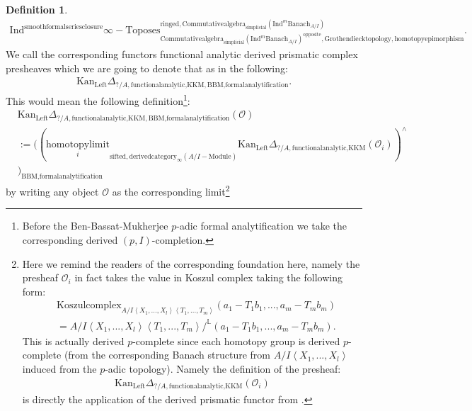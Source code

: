 \documentclass[11pt]{book}
\theoremstyle{definition}
\newtheorem{definition}[theorem]{Definition}
\numberwithin{equation}{section}
\begin{document}
\begin{definition}
\begin{align}
\mathrm{Ind}^\text{smoothformalseriesclosure}\infty-\mathrm{Toposes}^{\mathrm{ringed},\mathrm{Commutativealgebra}_{\mathrm{simplicial}}(\mathrm{Ind}^m\mathrm{Banach}_{A/I})}_{\mathrm{Commutativealgebra}_{\mathrm{simplicial}}(\mathrm{Ind}^m\mathrm{Banach}_{A/I})^\mathrm{opposite},\mathrm{Grothendiecktopology,homotopyepimorphism}}. 
\end{align}
We call the corresponding functors functional analytic derived prismatic complex presheaves which we are going to denote that as in the following:
\begin{align}
\mathrm{Kan}_{\mathrm{Left}}\Delta_{?/A,\text{functionalanalytic,KKM},\text{BBM,formalanalytification}}.	
\end{align}
This would mean the following definition{\footnote{Before the Ben-Bassat-Mukherjee $p$-adic formal analytification we take the corresponding derived $(p,I)$-completion.}}:
\begin{align}
&\mathrm{Kan}_{\mathrm{Left}}\Delta_{?/A,\text{functionalanalytic,KKM},\text{BBM,formalanalytification}}(\mathcal{O})\\
&:=	((\underset{i}{\text{homotopylimit}}_{\text{sifted},\text{derivedcategory}_{\infty}(A/I-\text{Module})}\mathrm{Kan}_{\mathrm{Left}}\Delta_{?/A,\text{functionalanalytic,KKM}}(\mathcal{O}_i))^\wedge\\
&)_\text{BBM,formalanalytification}
\end{align}
by writing any object $\mathcal{O}$ as the corresponding limit\footnote{Here we remind the readers of the corresponding foundation here, namely the presheaf $\mathcal{O}_i$ in fact takes the value in Koszul complex taking the following form:
\begin{align}
&\mathrm{Koszulcomplex}_{A/I\left<X_1,...,X_l\right>\left<T_1,...,T_m\right>}(a_1-T_1b_1,...,a_m-T_mb_m)\\
&= A/I\left<X_1,...,X_l\right>\left<T_1,...,T_m\right>/^\mathbb{L}(a_1-T_1b_1,...,a_m-T_mb_m).	
\end{align}
This is actually derived $p$-complete since each homotopy group is derived $p$-complete (from the corresponding Banach structure from $A/I\left<X_1,...,X_l\right>$ induced from the $p$-adic topology). Namely the definition of the presheaf:
\begin{align}
\mathrm{Kan}_{\mathrm{Left}}\Delta_{?/A,\text{functionalanalytic,KKM}}(\mathcal{O}_i)	
\end{align}
is directly the application of the derived prismatic functor from \cite[Construction 7.6]{12BS}.} 
\begin{center}

\end{center}
\end{definition}
\end{document}
